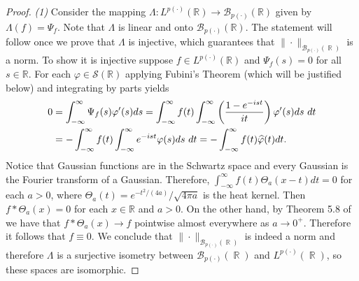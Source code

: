 \documentclass[11pt,reqno]{amsart}
\theoremstyle{definition}
\theoremstyle{definition}
\theoremstyle{definition}
\DeclareMathOperator{\R}{\mathbb{R}}
\newcommand{\p}{p(\cdot)}
\begin{document}
\begin{proof}
    {\it (1)} Consider the mapping $\Lambda: L^{p(\cdot)}(\mathbb{R}) \rightarrow \mathcal{B}_{\p}(\mathbb{R})$ given by $\Lambda(f)=\Psi_f$. Note that $\Lambda$ is linear and onto $\mathcal{B}_{\p}(\mathbb{R})$. The statement will follow once we prove that $\Lambda$ is injective, which guarantees that $\|\cdot\|_{\mathcal{B}_{\p}(\R)}$ is a norm. To show it is injective suppose $f \in L^{p(\cdot)}(\mathbb{R})$ and $\Psi_f(s)=0$ for all $s \in \mathbb{R}$. For each $\varphi \in \mathcal{S}(\mathbb{R})$ applying Fubini's Theorem (which will be justified below) and integrating by parts yields
\begin{align}\label{eq_Fubini}
0 & =\int_{-\infty}^{\infty} \Psi_f(s) \varphi^{\prime}(s) {d} s=\int_{-\infty}^{\infty} f(t) \int_{-\infty}^{\infty}\left(\frac{1-{e}^{-{i} s t}}{{i} t}\right) \varphi^{\prime}(s) {d} s {~d} t \\
& =-\int_{-\infty}^{\infty} f(t) \int_{-\infty}^{\infty} {e}^{-{i} s t} \varphi(s) {d} s {~d} t=-\int_{-\infty}^{\infty} f(t) \widehat{\varphi}(t) {d} t.  \notag
\end{align}
Notice that Gaussian functions are in the Schwartz space and every Gaussian is the Fourier transform of a Gaussian. Therefore, $\int_{-\infty}^{\infty} f(t) \Theta_a(x-t) {d} t=0$ for each $a>0$, where $\Theta_a(t)={e}^{-t^2 /(4 a)} / \sqrt{4 \pi a}$ is the heat kernel. Then $f * \Theta_a(x)=0$ for each $x \in \mathbb{R}$ and $a>0$. On the other hand, by Theorem 5.8 of \cite{Cruz-Uribe} we have that $f * \Theta_a(x)\to f$ pointwise almost everywhere as $a\to 0^+$. Therefore it follows that $f\equiv0$. We conclude that $\|\cdot\|_{\mathcal{B}_{\p}(\R)}$ is indeed a norm and therefore $\Lambda$ is a surjective isometry between $\mathcal{B}_{p(\cdot)}(\R)$ and $L^{p(\cdot)}(\R)$, so these spaces are isomorphic.


\end{proof}
\end{document}
